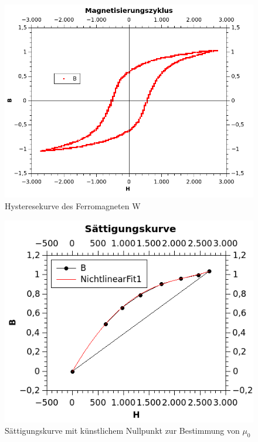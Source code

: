 \documentclass[12pt,a4paper]{article}
\begin{document}
\begin{multicols}{2}
\end{multicols}
\begin{figure}[H]
	\centering
	\includegraphics[scale=1]{./figures/Trafo_W_Hysterese.png}
	\caption{Hysteresekurve des Ferromagneten W}
	\label{fig:Trafo_W_Hysterese}
\end{figure}
\begin{figure}[H]
	\centering
	\includegraphics[scale=1]{./figures/Trafo_W_saettigung.png}
	\caption{Sättigungskurve mit künstlichem Nullpunkt zur Bestimmung von $\mu_0$}
	\label{fig:Trafo_W_saettigung}
\end{figure}
\end{document}
